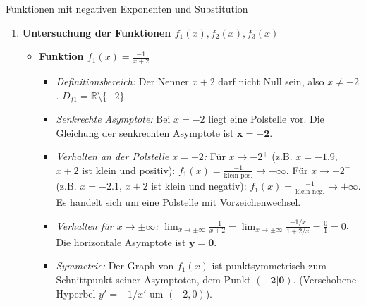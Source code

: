 \begin{loesungsumgebung}{Funktionen mit negativen Exponenten und Substitution}

\begin{enumerate}[label=(\alph*)]
    \item \textbf{Untersuchung der Funktionen $f_1(x), f_2(x), f_3(x)$}
    \begin{itemize}
        \item \textbf{Funktion $f_1(x) = \frac{-1}{x+2}$}
        \begin{itemize}
            \item \textit{Definitionsbereich:} Der Nenner $x+2$ darf nicht Null sein, also $x \neq -2$. $D_{f1} = \mathbb{R} \setminus \{-2\}$.
            \item \textit{Senkrechte Asymptote:} Bei $x=-2$ liegt eine Polstelle vor. Die Gleichung der senkrechten Asymptote ist $\mathbf{x=-2}$.
            \item \textit{Verhalten an der Polstelle $x=-2$:}
            Für $x \to -2^+$ (z.B. $x=-1.9$, $x+2$ ist klein und positiv): $f_1(x) = \frac{-1}{\text{klein pos.}} \to -\infty$.
            Für $x \to -2^-$ (z.B. $x=-2.1$, $x+2$ ist klein und negativ): $f_1(x) = \frac{-1}{\text{klein neg.}} \to +\infty$.
            Es handelt sich um eine Polstelle mit Vorzeichenwechsel.
            \item \textit{Verhalten für $x \to \pm\infty$:}
            $\lim_{x \to \pm\infty} \frac{-1}{x+2} = \lim_{x \to \pm\infty} \frac{-1/x}{1+2/x} = \frac{0}{1} = 0$.
            Die horizontale Asymptote ist $\mathbf{y=0}$.
            \item \textit{Symmetrie:} Der Graph von $f_1(x)$ ist punktsymmetrisch zum Schnittpunkt seiner Asymptoten, dem Punkt $\mathbf{(-2|0)}$. (Verschobene Hyperbel $y' = -1/x'$ um $(-2,0)$).
        \end{itemize}


\end{itemize}
\end{enumerate}
\end{loesungsumgebung}
